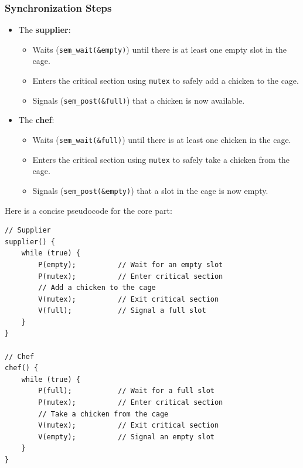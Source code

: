 \documentclass[a4paper]{book}
\begin{document}
\subsubsection{Synchronization Steps}
\begin{itemize}
\item 
The \textbf{supplier}:
\begin{itemize}
\item 
Waits (\verb|sem_wait(&empty)|) until there is at least one empty slot in the cage.

\item 
Enters the critical section using \verb|mutex| to safely add a chicken to the cage.

\item 
Signals (\verb|sem_post(&full)|) that a chicken is now available.

\end{itemize}

\item 
The \textbf{chef}:
\begin{itemize}
\item 
Waits (\verb|sem_wait(&full)|) until there is at least one chicken in the cage.

\item 
Enters the critical section using \verb|mutex| to safely take a chicken from the cage.

\item 
Signals (\verb|sem_post(&empty)|) that a slot in the cage is now empty.

\end{itemize}

\end{itemize}

Here is a concise pseudocode for the core part:

\begin{verbatim}
// Supplier
supplier() {
    while (true) {
        P(empty);          // Wait for an empty slot
        P(mutex);          // Enter critical section
        // Add a chicken to the cage
        V(mutex);          // Exit critical section
        V(full);           // Signal a full slot
    }
}

// Chef
chef() {
    while (true) {
        P(full);           // Wait for a full slot
        P(mutex);          // Enter critical section
        // Take a chicken from the cage
        V(mutex);          // Exit critical section
        V(empty);          // Signal an empty slot
    }
}
\end{verbatim}
\end{document}
